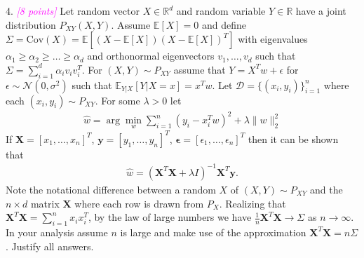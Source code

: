 \documentclass{article}
\newcommand{\1}{\mathbf{1}}
\def\E{\mathbb{E}}
\def\R{\mathbb{R}}
\newcommand{\mb}[1]{\mathbf{#1}}
\newcommand{\grade}[1]{\small\textcolor{magenta}{\emph{[#1 points]}} \normalsize}
\begin{document}
4.  \grade{8} Let random vector $X \in \R^d$ and random variable $Y \in \R$ have a joint distribution $P_{XY}(X,Y)$. 
Assume $\E[X]=0$ and define $\Sigma = \text{Cov}(X)=\E[(X-\E[X])(X-\E[X])^T]$ with eigenvalues $\alpha_1 \geq \alpha_2 \geq \dots \geq \alpha_d$ and orthonormal eigenvectors $v_1,\dots,v_d$ such that $\Sigma = \sum_{i=1}^d \alpha_i v_i v_i^T$.
For $(X,Y) \sim P_{XY}$ assume that $Y = X^T w + \epsilon$ for $\epsilon \sim \mathcal{N}(0,\sigma^2)$ such that $\E_{Y|X}[ Y | X=x] = x^T w$.
Let $\mathcal{D}=\{(x_i,y_i)\}_{i=1}^n$ where each $(x_i,y_i) \sim P_{XY}$.
For some $\lambda >0$ let 
\begin{align*}
\widehat{w} = \arg\min_w \sum_{i=1}^n (y_i - x_i^T w)^2 + \lambda \| w \|_2^2
\end{align*}
If $\mb{X}=[x_1,\dots,x_n]^T$, $\mb{y} = [y_1,\dots,y_n]^T$, $\boldsymbol{\epsilon} = [\epsilon_1,\dots,\epsilon_n]^T$ then it can be shown that 
\begin{align}\label{eq:ridge_soln}
\widehat{w} = (\mb{X}^T \mb{X} + \lambda I)^{-1} \mb{X}^T \mb{y}.
\end{align}
Note the notational difference between a random $X$ of $(X,Y)\sim P_{XY}$ and the $n \times d$ matrix $\mb{X}$ where each row is drawn from $P_X$.
Realizing that $\mb{X}^T \mb{X} = \sum_{i=1}^n x_i x_i^T$, by the law of large numbers we have $\frac{1}{n} \mb{X}^T\mb{X} \rightarrow \Sigma$ as $n \rightarrow \infty$. 
In your analysis assume $n$ is large and make use of the approximation $\mb{X}^T \mb{X} = n \Sigma$.
Justify all answers.
\end{document}
